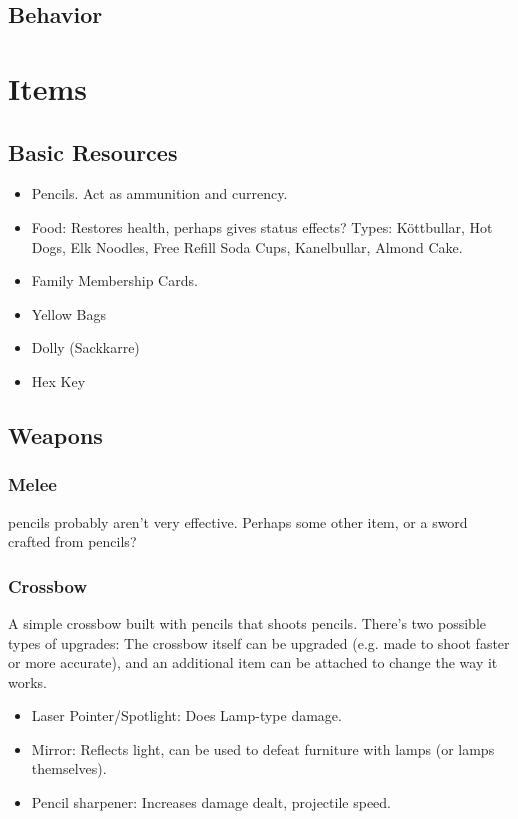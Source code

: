 \documentclass[a4paper]{article}
\theoremstyle{definition}
\theoremstyle{remark}
\begin{document}
\subsection{Behavior}

\section{Items}

\subsection{Basic Resources}

\begin{itemize}
  \item \ikea Pencils.
    Act as ammunition and currency.
  \item Food: Restores health, perhaps gives status effects?
    Types: Köttbullar, Hot Dogs, Elk Noodles, Free Refill Soda Cups,
    Kanelbullar, Almond Cake.
  \item \ikea Family Membership Cards.
  \item Yellow Bags
  \item Dolly (Sackkarre)
  \item Hex Key
\end{itemize}

\subsection{Weapons}

\subsubsection{Melee}

\ikea pencils probably aren't very effective.
Perhaps some other \ikea item, or a sword crafted from pencils?

\subsubsection{Crossbow}

A simple crossbow built with \ikea pencils that shoots \ikea pencils.
There's two possible types of upgrades:
The crossbow itself can be upgraded (e.g. made to shoot faster or more
accurate), and an additional item can be attached to change the way it
works.

\begin{itemize}
  \item Laser Pointer/Spotlight: Does Lamp-type damage.
  \item Mirror: Reflects light, can be used to defeat furniture with
    lamps (or lamps themselves).
  \item Pencil sharpener: Increases damage dealt, projectile speed.
\end{itemize}
\end{document}
